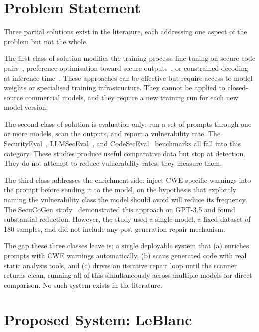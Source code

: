 \documentclass[12pt,a4paper]{report}
\begin{document}
\section{Problem Statement}
\label{sec:problem}

Three partial solutions exist in the literature, each addressing one aspect of
the problem but not the whole.

The first class of solution modifies the training process: fine-tuning on
secure code pairs~\cite{hexacoder2024}, preference optimisation toward secure
outputs~\cite{lpo2024}, or constrained decoding at inference
time~\cite{codeguard2024}. These approaches can be effective but require access
to model weights or specialised training infrastructure. They cannot be applied
to closed-source commercial models, and they require a new training run for each
new model version.

The second class of solution is evaluation-only: run a set of prompts through
one or more models, scan the outputs, and report a vulnerability rate. The
SecurityEval~\cite{securityeval}, LLMSecEval~\cite{tony2023llmseceval}, and
CodeSecEval~\cite{codeseceval2023} benchmarks all fall into this category. These
studies produce useful comparative data but stop at detection. They do not attempt
to reduce vulnerability rates; they measure them.

The third class addresses the enrichment side: inject CWE-specific warnings into
the prompt before sending it to the model, on the hypothesis that explicitly
naming the vulnerability class the model should avoid will reduce its frequency.
The SecuCoGen study~\cite{tihanyi2023secucogenicse} demonstrated this approach
on GPT-3.5 and found substantial reduction. However, the study used a single
model, a fixed dataset of 180 samples, and did not include any post-generation
repair mechanism.

The gap these three classes leave is: a single deployable system that (a) enriches
prompts with CWE warnings automatically, (b) scans generated code with real static
analysis tools, and (c) drives an iterative repair loop until the scanner
returns clean, running all of this simultaneously across multiple models for
direct comparison. No such system exists in the literature.

\section{Proposed System: LeBlanc}
\label{sec:proposed}
\end{document}
